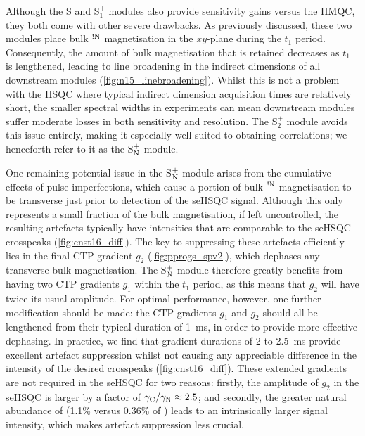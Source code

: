 \documentclass[11pt]{article}
\newcommand*{\noahS}{S}
\newcommand*{\noahSpa}{S$^+_1$}
\newcommand*{\noahSpb}{S$^+_2$}
\newcommand*{\noahSpn}{S$\rm ^+_N$}
\newcommand*{\hl}[1]{\textcolor{WildStrawberry}{#1}}
\newcommand*{\carbon}{\ce{^{13}C}}
\newcommand*{\nitrogen}{\ce{^{15}N}}
\newcommand*{\magnnot}[1]{\ce{^1H}$^{!#1}$}
\begin{document}
\hl{Although the \noahS{} and \noahSpa{} modules also provide sensitivity gains versus the HMQC, they both come with other severe drawbacks.}
As previously discussed, these two modules place bulk \magnnot{\ce{N}} magnetisation in the $xy$-plane during the $t_1$ period.
Consequently, the amount of bulk magnetisation that is retained decreases as $t_1$ is lengthened, leading to line broadening in the indirect dimensions of all downstream modules (\cref{fig:n15_linebroadening}).
Whilst this is not a problem with the \carbon{} HSQC where typical \carbon{} indirect dimension acquisition times are relatively short, the smaller spectral widths in \nitrogen{} experiments can mean downstream modules suffer moderate losses in both sensitivity and resolution.
The \noahSpb{} module avoids this issue entirely, making it especially well-suited to obtaining \nitrogen{} correlations; \hl{we henceforth refer to it as the \noahSpn{} module.}

One remaining potential issue in the \noahSpn{} module arises from the cumulative effects of pulse imperfections, which cause a portion of bulk \magnnot{\ce{N}} magnetisation to be transverse just prior to detection of the seHSQC signal.
Although this only represents a small fraction of the bulk magnetisation, if left uncontrolled, the resulting artefacts typically have intensities that are comparable to the seHSQC crosspeaks (\cref{fig:cnst16_diff}).
The key to suppressing these artefacts efficiently lies in the final CTP gradient $g_2$ (\cref{fig:pprogs_spv2}), which dephases any transverse bulk magnetisation.
The \noahSpn{} module therefore greatly benefits from having two CTP gradients $g_1$ within the $t_1$ period, as this means that $g_2$ will have twice its usual amplitude.
For optimal performance, however, \hl{one further modification should be made:} the CTP gradients $g_1$ and $g_2$ should all be lengthened from their typical duration of \SI{1}{\ms}, in order to provide more effective dephasing.
In practice, we find that gradient durations of 2 to \SI{2.5}{\ms} provide excellent artefact suppression whilst not causing any appreciable difference in the intensity of the desired crosspeaks (\cref{fig:cnst16_diff}).
These extended gradients are not required in the \carbon{} seHSQC for two reasons: firstly, the amplitude of $g_2$ in the \carbon{} seHSQC is larger by a factor of $\gamma_{\ce{C}}/\gamma_{\ce{N}} \approx 2.5$; and secondly, the greater natural abundance of \carbon{} (1.1\% versus 0.36\% of \nitrogen{}) leads to an intrinsically larger signal intensity\hl{, which makes artefact suppression less crucial.}
\end{document}
